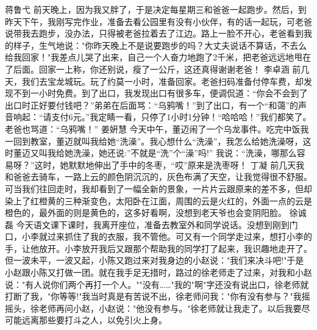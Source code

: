{}蒋鲁弋\markdownRendererInterblockSeparator
{}前天晚上，因为我又胖了，于是决定每星期三和爸爸一起跑步。然后，到昨天下午，我刚写完作业，准备去看公园里有没有小伙伴，有的话一起玩，可老爸说带我去跑步，没办法，只得被老爸拉着去了江边。路上一脸不开心，老爸看到我的样子，生气地说："你昨天晚上不是说要跑步的吗？大丈夫说话不算话，不去么给我回家！"我差点儿哭了出来，自己一个人奋力地跑了2千米，把老爸远远地甩在了后面。回家一上称，你还别说，瘦了一公斤，这还真得谢谢老爸！\markdownRendererInterblockSeparator
{}\markdownRendererInterblockSeparator
{}李卓涵\markdownRendererInterblockSeparator
{}前几天，我们去宝龙城玩。玩了约莫一小时，准备回家。老爸扫码准备付停车费，却发现不到一小时免费。到了出口，我发现出口有很多车，便调侃道：“你会不会到了出口时正好要付钱吧？”弟弟在后面骂：“乌鸦嘴！”到了出口，有一个“和蔼”的声音响起：“请支付6元。”我定睛一看，只停了1小时1分钟！“哈哈哈！”我们都笑了。老爸也骂道：“乌鸦嘴！”\markdownRendererInterblockSeparator
{}\markdownRendererInterblockSeparator
{}姜姸慧\markdownRendererInterblockSeparator
{}今天中午，董迈闹了一个乌龙事件。吃完中饭我一回到教室，董迈就叫我给她“洗澡”。我心想什么“洗澡”，我怎么给她洗澡呀，这时董迈又叫我给她洗澡，她还说:”不就是“洗”个“澡”吗!” 我说：“洗澡，哪那么容易呀？”这时，她默默地伸出了手中的冬枣，“哎”原来是洗枣呀！\markdownRendererInterblockSeparator
{}\markdownRendererInterblockSeparator
{}丁凝\markdownRendererInterblockSeparator
{}前几天我和爸爸去骑车，一路上云的颜色阴沉沉的，灰色布满了天空，让我觉得很不舒服。可当我们往回走时，我却看到了一幅全新的景象，一片片云跟原来的差不多，但却染上了红橙黄的三种渐变色，太阳卧在江面，周围的云是火红的，外面一点的云是橙色的，最外面的则是黄色的，这多好看啊，没想到老天爷也会变阴阳脸。\markdownRendererInterblockSeparator
{}\markdownRendererInterblockSeparator
{}徐诚磊\markdownRendererInterblockSeparator
{}今天语文课下课时，我离开座位，准备去教室外和同学说话。没想到刚到门口，小李就过来抓住了我的衣服，我不管他。可又有一个同学走过来，想打小李的手，让他放开。小李放开我后又跟那个帮助我的同学打了起来，我识趣地走开了。但一波未平，一波又起，小陈又跑过来对我身边的小赵说："我们来决斗吧!"于是小赵跟小陈又打做一团。就在我手足无措时，路过的徐老师走了过来，对我和小赵说："有人说你们两个再打一个人。""没有……"我的"啊"字还没有说出口，徐老师就打断了我，"你等等!"我当时真是有苦说不出，徐老师问我："你有没有参与？"我摇摇头，徐老师再问小赵，小赵说："他没有参与。"徐老师就让我走了。以后我要尽可能远离那些要打斗之人，以免引火上身。\markdownRendererInterblockSeparator
